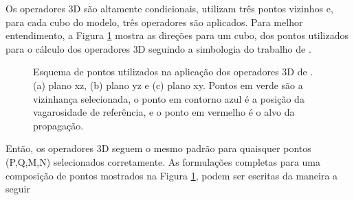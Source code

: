 Os operadores 3D são altamente condicionais, utilizam três pontos vizinhos e, para cada cubo do modelo, três operadores são aplicados. Para melhor entendimento, a Figura \ref{fig:voxel3d} mostra as direções para um cubo, dos pontos utilizados para o cálculo dos operadores 3D seguindo a simbologia do trabalho de . 
\begin{figure}[H]
	\centering
	
		
	\caption{Esquema de pontos utilizados na aplicação dos operadores 3D de . (a) plano xz, (b) plano yz e (c) plano xy. Pontos em verde são a vizinhança selecionada, o ponto em contorno azul é a posição da vagarosidade de referência, e o ponto em vermelho é o alvo da propagação.}
	\label{fig:voxel3d}
\end{figure}
\noindent Então, os operadores 3D seguem o mesmo padrão para quaisquer pontos (P,Q,M,N) selecionados corretamente. As formulações completas para uma composição de pontos mostrados na Figura \ref{fig:voxel3d}, podem ser escritas da maneira a seguir
